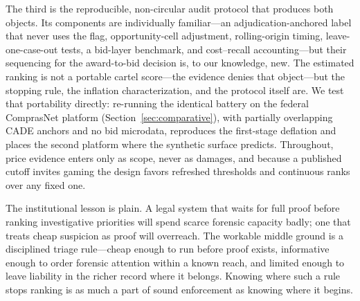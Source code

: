 The third is the reproducible, non-circular audit protocol that
produces both objects. Its components are individually familiar---an
adjudication-anchored label that never uses the flag, opportunity-cell
adjustment, rolling-origin timing, leave-one-case-out tests, a
bid-layer benchmark, and cost--recall accounting---but their sequencing
for the award-to-bid decision is, to our knowledge, new. The estimated
ranking is not a portable cartel score---the evidence denies that
object---but the stopping rule, the inflation characterization, and the
protocol itself are. We test that portability directly: re-running the
identical battery on the federal ComprasNet platform
(Section~\ref{sec:comparative}), with partially overlapping CADE anchors
and no bid microdata, reproduces the first-stage deflation and places
the second platform where the synthetic surface predicts. Throughout,
price evidence enters only as scope, never as damages, and because a
published cutoff invites gaming the design favors refreshed thresholds
and continuous ranks over any fixed one.

The institutional lesson is plain. A legal system that waits for full
proof before ranking investigative priorities will spend scarce
forensic capacity badly; one that treats cheap suspicion as proof will
overreach. The workable middle ground is a disciplined triage
rule---cheap enough to run before proof exists, informative enough to
order forensic attention within a known reach, and limited enough to
leave liability in the richer record where it belongs. Knowing where
such a rule stops ranking is as much a part of sound enforcement as
knowing where it begins.
